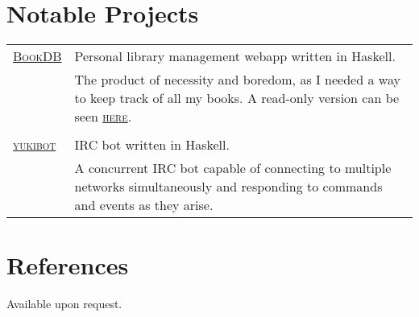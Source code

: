 \documentclass[a4paper,10pt]{article}
\newcommand{\schref}[2]{\href{#1}{\textsc{#2}}}
\newenvironment{cvtable}{\begin{tabular}{x{2cm}|p{11.6cm}}}{\end{tabular}}
\newcommand{\heading}[1]{\textsc{#1} &}
\newcommand{\detail}[1]{ & \footnotesize{#1}}
\begin{document}
\section{Notable Projects}
\begin{cvtable}
  \heading{\schref{https://github.com/barrucadu/bookdb}{BookDB}}
  Personal library management webapp written in Haskell.\\
  \detail{The product of necessity and boredom, as I needed a way to
    keep track of all my books. A read-only version can be seen
    \schref{http://www.barrucadu.co.uk/bookdb/}{here}.}\\\\


  \heading{\schref{https://github.com/barrucadu/yukibot}{yukibot}}
  IRC bot written in Haskell.\\
  \detail{A concurrent IRC bot capable of connecting to multiple
    networks simultaneously and responding to commands and events as
    they arise.}
\end{cvtable}

\section{References}
Available upon request.
\end{document}
